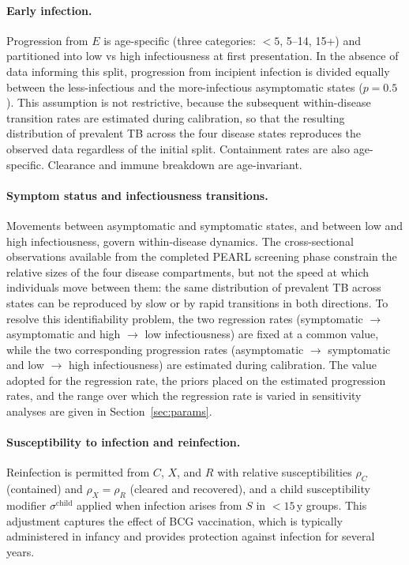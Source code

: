 \documentclass[11pt]{article}
\begin{document}
\paragraph{Early infection.}
Progression from \(E\) is age-specific (three categories: $<5$, 5--14, 15+) and partitioned into low vs high infectiousness at first presentation. In the absence of data informing this split, progression from incipient infection is divided equally between the less-infectious and the more-infectious asymptomatic states (\(p=0.5\)). This assumption is not restrictive, because the subsequent within-disease transition rates are estimated during calibration, so that the resulting distribution of prevalent TB across the four disease states reproduces the observed data regardless of the initial split. Containment rates are also age-specific. Clearance and immune breakdown are age-invariant.

\paragraph{Symptom status and infectiousness transitions.}
\label{sec:tb_disease}
Movements between asymptomatic and symptomatic states, and between low and high infectiousness, govern within-disease dynamics. The cross-sectional observations available from the completed PEARL screening phase constrain the relative sizes of the four disease compartments, but not the speed at which individuals move between them: the same distribution of prevalent TB across states can be reproduced by slow or by rapid transitions in both directions. To resolve this identifiability problem, the two regression rates (symptomatic \(\to\) asymptomatic and high \(\to\) low infectiousness) are fixed at a common value, while the two corresponding progression rates (asymptomatic \(\to\) symptomatic and low \(\to\) high infectiousness) are estimated during calibration. The value adopted for the regression rate, the priors placed on the estimated progression rates, and the range over which the regression rate is varied in sensitivity analyses are given in Section~\ref{sec:params}.

\paragraph{Susceptibility to infection and reinfection.}
Reinfection is permitted from \(C\), \(X\), and \(R\) with relative susceptibilities \(\rho_C\) (contained) and \(\rho_X=\rho_R\) (cleared and recovered), and a child susceptibility modifier \(\sigma^{\text{child}}\) applied when infection arises from \(S\) in $<15$\,y groups.
This adjustment captures the effect of BCG vaccination, which is typically administered in infancy and provides protection against infection for several years.
\end{document}
